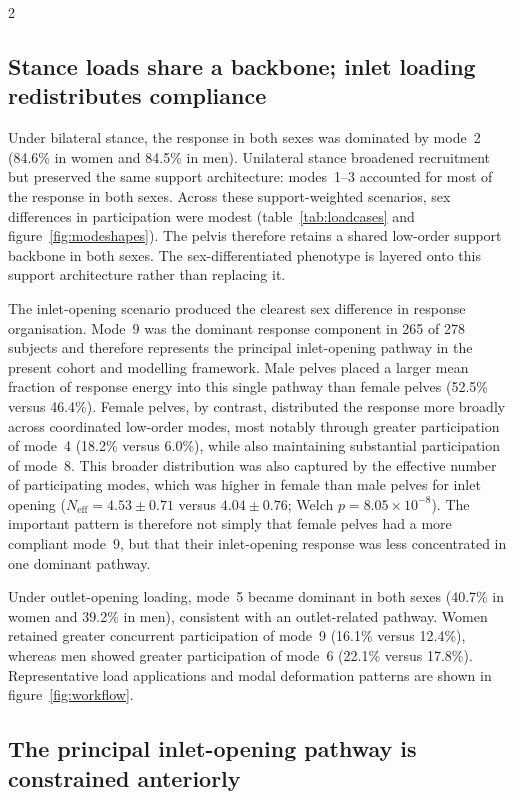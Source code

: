 \documentclass[openacc]{rsproca_new}
\begin{document}
\begin{multicols}{2}
\subsection{Stance loads share a backbone; inlet loading redistributes compliance}

Under bilateral stance, the response in both sexes was dominated by mode~2 (84.6\% in women and 84.5\% in men). Unilateral stance broadened recruitment but preserved the same support architecture: modes~1--3 accounted for most of the response in both sexes. Across these support-weighted scenarios, sex differences in participation were modest (table~\ref{tab:loadcases} and figure~\ref{fig:modeshapes}). The pelvis therefore retains a shared low-order support backbone in both sexes. The sex-differentiated phenotype is layered onto this support architecture rather than replacing it.

The inlet-opening scenario produced the clearest sex difference in response organisation. Mode~9 was the dominant response component in 265 of 278 subjects and therefore represents the principal inlet-opening pathway in the present cohort and modelling framework. Male pelves placed a larger mean fraction of response energy into this single pathway than female pelves (52.5\% versus 46.4\%). Female pelves, by contrast, distributed the response more broadly across coordinated low-order modes, most notably through greater participation of mode~4 (18.2\% versus 6.0\%), while also maintaining substantial participation of mode~8. This broader distribution was also captured by the effective number of participating modes, which was higher in female than male pelves for inlet opening ($N_{\mathrm{eff}}=4.53\pm0.71$ versus $4.04\pm0.76$; Welch $p=8.05\times10^{-8}$). The important pattern is therefore not simply that female pelves had a more compliant mode~9, but that their inlet-opening response was less concentrated in one dominant pathway.

Under outlet-opening loading, mode~5 became dominant in both sexes (40.7\% in women and 39.2\% in men), consistent with an outlet-related pathway. Women retained greater concurrent participation of mode~9 (16.1\% versus 12.4\%), whereas men showed greater participation of mode~6 (22.1\% versus 17.8\%). Representative load applications and modal deformation patterns are shown in figure~\ref{fig:workflow}.

\subsection{The principal inlet-opening pathway is constrained anteriorly}


\end{multicols}
\end{document}
